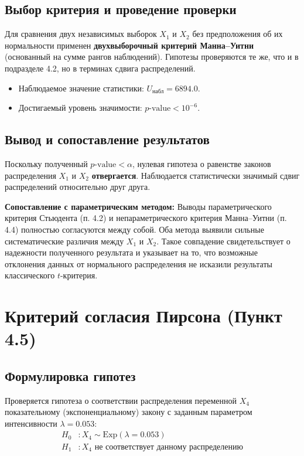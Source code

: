\documentclass[12pt,a4paper]{article}
\begin{document}
\subsection{Выбор критерия и проведение проверки}
Для сравнения двух независимых выборок $X_1$ и $X_2$ без предположения об их нормальности применен \textbf{двухвыборочный критерий Манна--Уитни} (основанный на сумме рангов наблюдений).
Гипотезы проверяются те же, что и в подразделе 4.2, но в терминах сдвига распределений.
\begin{itemize}
    \item Наблюдаемое значение статистики: $U_{\text{набл}} = 6894.0$.
    \item Достигаемый уровень значимости: $p\text{-value} < 10^{-6}$.
\end{itemize}

\subsection{Вывод и сопоставление результатов}
Поскольку полученный $p\text{-value} < \alpha$, нулевая гипотеза о равенстве законов распределения $X_1$ и $X_2$ \textbf{отвергается}. Наблюдается статистически значимый сдвиг распределений относительно друг друга.

\textbf{Сопоставление с параметрическим методом:}
Выводы параметрического критерия Стьюдента (п. 4.2) и непараметрического критерия Манна--Уитни (п. 4.4) полностью согласуются между собой. Оба метода выявили сильные систематические различия между $X_1$ и $X_2$. Такое совпадение свидетельствует о надежности полученного результата и указывает на то, что возможные отклонения данных от нормального распределения не исказили результаты классического $t$-критерия.

\section{Критерий согласия Пирсона (Пункт 4.5)}

\subsection{Формулировка гипотез}
Проверяется гипотеза о соответствии распределения переменной $X_4$ показательному (экспоненциальному) закону с заданным параметром интенсивности $\lambda = 0.053$:
\begin{align*}
    H_0 &: X_4 \sim \text{Exp}(\lambda = 0.053) \\
    H_1 &: X_4 \text{ не соответствует данному распределению}
\end{align*}
\end{document}
